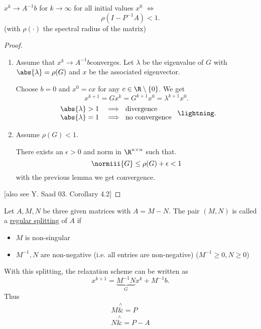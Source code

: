 \begin{enumerate}[label=\Alph{enumi})]
		\begin{theorem}
		\label{thm:richardconvergencetheorem}
			$x^{k} \rightarrow A^{-1}b$ for $k \rightarrow \infty$ for all initial values $x^{0}$ $\iff$
			\[
				\rho(I-P^{-1}A) < 1
			.\] 
			(with $\rho(\cdot)$ the spectral radius of the matrix)
		\end{theorem}
		\begin{proof}
		\label{thm:richardconvergencetheoremproof}
		\begin{enumerate}[label=\arabic{enumii})]
			\item Assume that $x^{k}\rightarrow A^{-1}b$converges. Let $\lambda $ be the eigenvalue of $G$ with  $\abs{\lambda }  = \rho(G)$ and $x$ be the associated eigenvector.
				
				Choose $b=0$ and $x^{0}=cx$ for any $c \in \R \setminus \left\{ 0 \right\} $. We get
				\[
				x^{k+1} = Gx^{k} = G^{k+1}x^{0} = \lambda ^{k+1} x^{0}
				.\] 
				\[
					\begin{array}{rl}
						\abs{\lambda } >1 &\implies \text{ divergence } \\
						\abs{\lambda }  = 1 &\implies \text{ no convergence }
				\end{array}
				\lightning
				.\] 
			\item Assume $\rho(G)<1$.

				There exists an $\epsilon >0$ and norm in $\R^{n \times n}$ such that.
				\[
					\normiii{G} \leq \rho(G) + \epsilon  < 1
				\] 
				with the previous lemma we get convergence.
		\end{enumerate}
		[also see Y. Saad 03. Corollary 4.2]
		\end{proof}
\end{enumerate}

\begin{definition}
\label{thm:additivesplitting}
Let $A, M, N$ be three given matrices with $ A = M-N$. The pair $(M,N)$ is called a \underline{regular splitting} of $A$ if
\begin{itemize}
	\item $M$ is non-singular
	\item $M^{-1}, N$ are non-negative (i.e. all entries are non-negative) ($M^{-1} \geq 0, N \geq 0$)
\end{itemize}
\end{definition}
With this splitting, the relaxation scheme can be written as 
\[
	x^{k+1} = \underbrace{M^{-1}N}_{G} x^{k} + M^{-1}b
.\] 
Thus
\begin{align*}
M \overset{\wedge}&{=} P \\
N \overset{\wedge}&{=} P-A
\end{align*}

